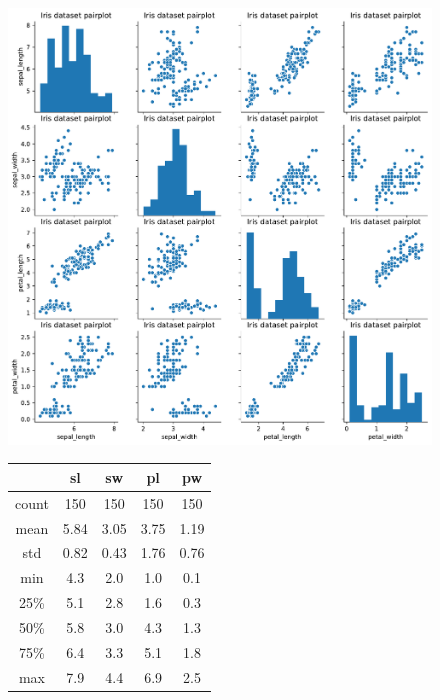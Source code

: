 \documentclass[11pt]{scrartcl}
\begin{document}
\begin{figure}[H]
	\begin{minipage}{0.9\linewidth}
		\begin{minipage}[b]{0.5\linewidth}
		  \centering
		  \includegraphics[width= \linewidth]{fig/iris_pairplot.pdf}
		  \label{iris_des}
		\end{minipage}
		\hfill
		\begin{minipage}[b]{0.4\linewidth}
		  \centering
			\begin{tabular}{c|cccc}
				\hline
				 & sl & sw & pl & pw \\
				\hline
				count & 150 & 150 & 150 & 150\\
				mean & 5.84 & 3.05 & 3.75 & 1.19\\
				std & 0.82 & 0.43 & 1.76 & 0.76\\
				min & 4.3 & 2.0 & 1.0 & 0.1 \\
				25\% & 5.1 & 2.8 & 1.6 & 0.3\\
				50\% & 5.8 & 3.0 & 4.3 & 1.3\\
				75\% & 6.4 & 3.3 & 5.1 & 1.8 \\
				max & 7.9 & 4.4  & 6.9 & 2.5 \\
				\hline
			\end{tabular} 
		\label{iris_table}
		\end{minipage}
	\end{minipage}
\end{figure}
\end{document}
